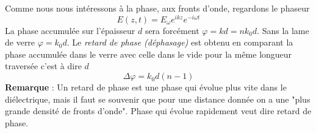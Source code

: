 Comme nous nous intéressons à la phase, aux fronts d'onde, regardons le phaseur
\begin{equation}
E(z,t) = E_\omega e^{ikz}e^{-i\omega t}
\end{equation}
La phase accumulée sur l'épaisseur $d$ sera forcément $\varphi = kd = nk_0d$. Sans la lame de verre 
$\varphi = k_0d$. Le \textit{retard de phase (déphasage)} est obtenu en comparant la phase accumulée 
dans le verre avec celle dans le vide pour la même longueur traversée c'est à dire $d$
\begin{equation}
\Delta\varphi = k_0d(n-1)
\end{equation}
\textbf{Remarque} : Un retard de phase est une phase qui évolue plus vite dans le diélectrique, mais 
il faut se souvenir que pour une distance donnée on a une "plus grande densité de fronts d'onde". Phase 
qui évolue rapidement veut dire retard de phase.\\
































